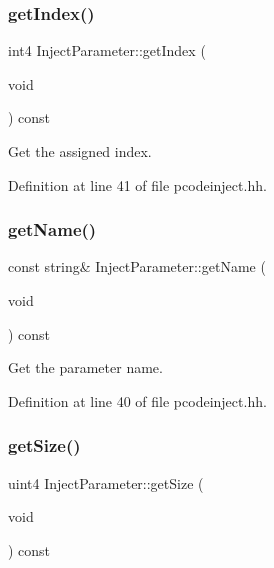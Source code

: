 \subsubsection{\texorpdfstring{getIndex()}{getIndex()}}
{\footnotesize\ttfamily int4 Inject\+Parameter\+::get\+Index (\begin{DoxyParamCaption}\item[{void}]{ }\end{DoxyParamCaption}) const\hspace{0.3cm}{\ttfamily [inline]}}



Get the assigned index. 



Definition at line 41 of file pcodeinject.\+hh.

\mbox{\label{class_inject_parameter_ae832644b1c2569f8bc0e65bc9927a23c}} 
\subsubsection{\texorpdfstring{getName()}{getName()}}
{\footnotesize\ttfamily const string\& Inject\+Parameter\+::get\+Name (\begin{DoxyParamCaption}\item[{void}]{ }\end{DoxyParamCaption}) const\hspace{0.3cm}{\ttfamily [inline]}}



Get the parameter name. 



Definition at line 40 of file pcodeinject.\+hh.

\mbox{\label{class_inject_parameter_a0b0bd7385977774d8069fe3320c4a1b5}} 
\subsubsection{\texorpdfstring{getSize()}{getSize()}}
{\footnotesize\ttfamily uint4 Inject\+Parameter\+::get\+Size (\begin{DoxyParamCaption}\item[{void}]{ }\end{DoxyParamCaption}) const\hspace{0.3cm}{\ttfamily [inline]}}



